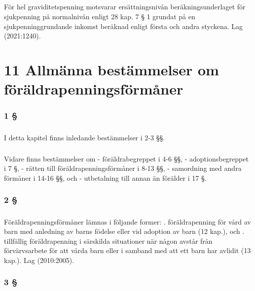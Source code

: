 \documentclass[a4paper,notitlepage,openany,10pt]{book}
\begin{document}
\paragraph*{}
För hel graviditetspenning motsvarar ersättningsnivån beräkningsunderlaget för sjukpenning på normalnivån enligt 28 kap. 7 § 1 grundat på en sjukpenninggrundande inkomst beräknad enligt första och andra styckena.
Lag (2021:1240).
\chapter*{11 Allmänna bestämmelser om föräldrapenningsförmåner}
\subsection*{1 §}
\paragraph*{}
I detta kapitel finns inledande bestämmelser i 2-3 §§.
\paragraph*{}
Vidare finns bestämmelser om
\newline - föräldrabegreppet i 4-6 §§,
\newline - adoptionsbegreppet i 7 §,
\newline - rätten till föräldrapenningsförmåner i 8-13 §§,
\newline - samordning med andra förmåner i 14-16 §§, och
\newline - utbetalning till annan än förälder i 17 §.
\subsection*{2 §}
\paragraph*{}
Föräldrapenningsförmåner lämnas i följande former:
. föräldrapenning för vård av barn med anledning av barns födelse eller vid adoption av barn (12 kap.), och
. tillfällig föräldrapenning i särskilda situationer när någon avstår från förvärvsarbete för att vårda barn eller i samband med att ett barn har avlidit (13 kap.).
Lag (2010:2005).
\subsection*{3 §}
\end{document}
